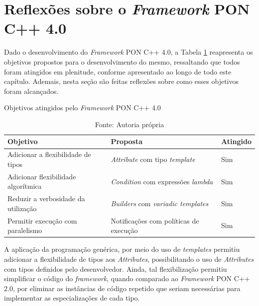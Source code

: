 
\section{Reflexões sobre o \textit{Framework} PON C++ 4.0}\label{sec:dev_reflex}

Dado o desenvolvimento do \textit{Framework} PON C++ 4.0, a Tabela
\ref{tab:obj_fw4_atingidos} reapresenta os objetivos propostos para o
desenvolvimento do mesmo, ressaltando que todos foram atingidos em plenitude,
conforme apresentado ao longo de todo este capítulo. Ademais, nesta seção são
feitas reflexões sobre como esses objetivos foram alcançados.

\begin{table}[!htb]
\centering
\caption{Objetivos atingidos pelo \textit{Framework} PON C++ 4.0}
\caption*{Fonte: Autoria própria}
\label{tab:obj_fw4_atingidos}
\smallskip
\begin{tabularx}{\textwidth}{|l|X|l|}\hline
    Objetivo & Proposta & Atingido  \\\hline\hline
    Adicionar a flexibilidade de tipos & \textit{Attribute} com tipo \textit{template} & Sim \\ \hline
    Adicionar flexibilidade algorítmica & \textit{Condition} com expressões \textit{lambda} & Sim \\ \hline
    Reduzir a verbosidade da utilização & \textit{Builders} com \textit{variadic templates} & Sim \\ \hline
    Permitir execução com paralelismo & Notificações com políticas de execução & Sim \\ \hline
\end{tabularx}
\end{table}

A aplicação da programação genérica, por meio do uso de \textit{templates}
permitiu adicionar a flexibilidade de tipos aos \textit{Attributes},
possibilitando o uso de \textit{Attributes} com tipos definidos pelo
desenvolvedor. Ainda, tal flexibilização permitiu simplificar o código do
\textit{framework}, quando comparado ao \textit{Framework} PON C++ 2.0, por
eliminar as instâncias de código repetido que seriam necessárias para
implementar as especializações de cada tipo. 

